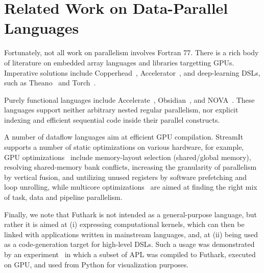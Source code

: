 \section{Related Work on Data-Parallel Languages}

Fortunately, not all work on parallelism involves Fortran 77.  There
is a rich body of literature on embedded array languages and libraries
targetting GPUs. Imperative solutions include
Copperhead~\cite{Copperhead}, Accelerator~\cite{MSaccelerator}, and
deep-learning DSLs, such as Theano~\cite{Theano} and
Torch~\cite{Torch7}.

Purely functional languages include
Accelerate~\cite{mcdonell2013optimising},
Obsidian~\cite{claessen2012expressive}, and
NOVA~\cite{collins2014nova}.  These languages support neither
arbitrary nested regular parallelism, nor explicit indexing and
efficient sequential code inside their parallel constructs.

A number of dataflow languages aim at efficient GPU compilation.
StreamIt supports a number of static optimizations on various
hardware, for example, GPU
optimizations~\cite{Hormati:2011:SPS:1950365.1950409} include
memory-layout selection (shared/global memory), resolving
shared-memory bank conflicts, increasing the granularity of
parallelism by vertical fusion, and untilizing unused registers by
software prefetching and loop unrolling, while multicore
optimizations~\cite{Gordon:2006:ECT:1168857.1168877} are aimed at
finding the right mix of task, data and pipeline parallelism.

Finally, we note that Futhark is not intended as a general-purpose
language, but rather it is aimed at (i) expressing computational
kernels, which can then be linked with applications written in
mainstream languages, and, at (ii) being used as a code-generation
target for high-level DSLs.  Such a usage was demonstrated by an
experiment~\cite{ElsmanDybdal:Array:2014,Henriksen:2016:AGT:2975991.2975997}
in which a subset of APL was compiled to Futhark, executed on GPU, and
used from Python for visualization purposes.


